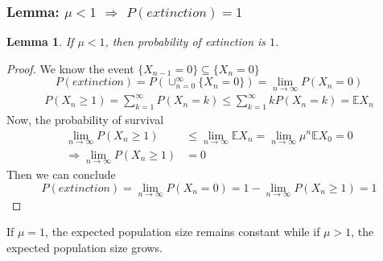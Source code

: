 \documentclass[11pt,a4paper]{article}
\newtheorem{lemma}{Lemma}
\begin{document}
\subsubsection{Lemma: $\mu<1$ $\Rightarrow$ $P(extinction)=1$}
\begin{lemma}
    If $\mu < 1$, then probability of extinction is $1$.
\end{lemma}
\begin{proof}
    We know the event $\{X_{n-1}=0\}\subseteq \{X_{n}=0\}$
    $$P(extinction)=P(\cup_{n=0}^\infty\{X_n=0\})=\lim_{n \rightarrow \infty}P(X_n=0)$$
    \begin{equation}
        \begin{aligned}
            P(X_n\geq 1)=\sum_{k=1}^\infty P(X_n=k)\leq \sum_{k=1}^\infty kP(X_n=k)= \mathbb{E}X_n
        \end{aligned}
        \nonumber
    \end{equation}
    Now, the probability of survival
    \begin{equation}
        \begin{aligned}
            \lim_{n \rightarrow \infty}P(X_n\geq 1)&\leq \lim_{n \rightarrow \infty} \mathbb{E}X_n=\lim_{n \rightarrow \infty} \mu^n \mathbb{E}X_0=0\\
            \Rightarrow \lim_{n \rightarrow \infty}P(X_n\geq 1)&=0
        \end{aligned}
        \nonumber
    \end{equation}
    Then we can conclude $$P(extinction)=\lim_{n \rightarrow \infty}P(X_n=0)=1-\lim_{n \rightarrow \infty}P(X_n\geq 1)=1$$
\end{proof}

If $\mu = 1$, the expected population size remains constant while if $\mu > 1$, the expected population size grows.
\end{document}
